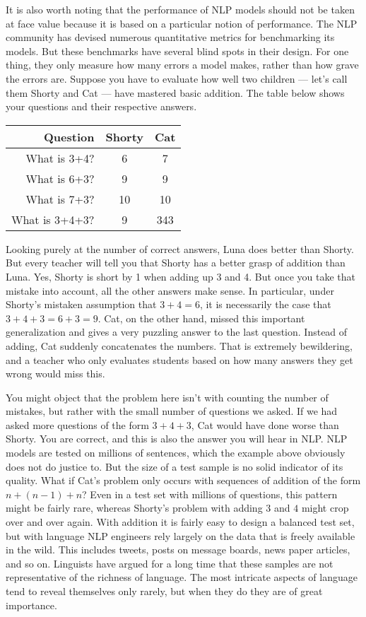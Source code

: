 It is also worth noting that the performance of NLP models should not be taken at face value because it is based on a particular notion of performance.
The NLP community has devised numerous quantitative metrics for benchmarking its models.
But these benchmarks have several blind spots in their design.
For one thing, they only measure how many errors a model makes, rather than how grave the errors are.
Suppose you have to evaluate how well two children --- let's call them Shorty and Cat --- have mastered basic addition.
The table below shows your questions and their respective answers.
%
\begin{center}
    \begin{tabular}{rcc}
        \toprule
        \textbf{Question} & \textbf{Shorty} & \textbf{Cat}\\
        \midrule
        What is 3+4? & 6 & 7\\
        What is 6+3? & 9 & 9\\
        What is 7+3? & 10 & 10\\
        What is 3+4+3? & 9 & 343\\
        \bottomrule
    \end{tabular}
\end{center}
%
Looking purely at the number of correct answers, Luna does better than Shorty.
But every teacher will tell you that Shorty has a better grasp of addition than Luna.
Yes, Shorty is short by 1 when adding up 3 and 4.
But once you take that mistake into account, all the other answers make sense.
In particular, under Shorty's mistaken assumption that $3 + 4 = 6$, it is necessarily the case that $3 + 4 + 3 = 6 + 3 = 9$.
Cat, on the other hand, missed this important generalization and gives a very puzzling answer to the last question.
Instead of adding, Cat suddenly concatenates the numbers.
That is extremely bewildering, and a teacher who only evaluates students based on how many answers they get wrong would miss this.

You might object that the problem here isn't with counting the number of mistakes, but rather with the small number of questions we asked.
If we had asked more questions of the form $3 + 4 + 3$, Cat would have done worse than Shorty.
You are correct, and this is also the answer you will hear in NLP.
NLP models are tested on millions of sentences, which the example above obviously does not do justice to.
But the size of a test sample is no solid indicator of its quality.
What if Cat's problem only occurs with sequences of addition of the form $n + (n - 1) + n$?
Even in a test set with millions of questions, this pattern might be fairly rare, whereas Shorty's problem with adding $3$ and $4$ might crop over and over again.
With addition it is fairly easy to design a balanced test set, but with language NLP engineers rely largely on the data that is freely available in the wild.
This includes tweets, posts on message boards, news paper articles, and so on.
Linguists have argued for a long time that these samples are not representative of the richness of language.
The most intricate aspects of language tend to reveal themselves only rarely, but when they do they are of great importance.

